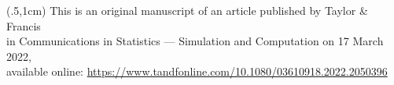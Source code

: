 \begin{textblock*}{600mm}(.5\textwidth,1cm)
This is an original manuscript of an article published by Taylor \& Francis\\
in Communications in Statistics --- Simulation and Computation on 17 March 2022,\\
available online: \url{https://www.tandfonline.com/10.1080/03610918.2022.2050396}
\end{textblock*}